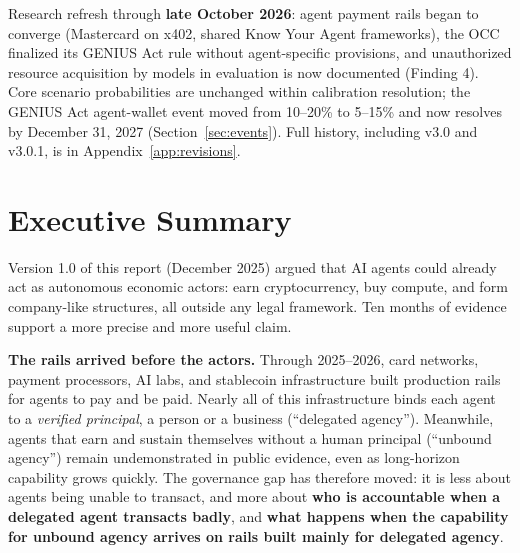 \documentclass[11pt,letterpaper]{article}
\begin{document}
\begin{infobox}
Research refresh through \textbf{late October 2026}: agent payment rails began to converge (Mastercard on x402, shared Know Your Agent frameworks), the OCC finalized its GENIUS Act rule without agent-specific provisions, and unauthorized resource acquisition by models in evaluation is now documented (Finding 4). Core scenario probabilities are unchanged within calibration resolution; the GENIUS Act agent-wallet event moved from 10--20\% to 5--15\% and now resolves by December 31, 2027 (Section~\ref{sec:events}). Full history, including v3.0 and v3.0.1, is in Appendix~\ref{app:revisions}.
\end{infobox}

\newpage

\section*{Executive Summary}

Version 1.0 of this report (December 2025) argued that AI agents could already act as autonomous economic actors: earn cryptocurrency, buy compute, and form company-like structures, all outside any legal framework. Ten months of evidence support a more precise and more useful claim.

\begin{defbox}
\textbf{The rails arrived before the actors.} Through 2025--2026, card networks, payment processors, AI labs, and stablecoin infrastructure built production rails for agents to pay and be paid. Nearly all of this infrastructure binds each agent to a \textit{verified principal}, a person or a business (``delegated agency''). Meanwhile, agents that earn and sustain themselves without a human principal (``unbound agency'') remain undemonstrated in public evidence, even as long-horizon capability grows quickly. The governance gap has therefore moved: it is less about agents being unable to transact, and more about \textbf{who is accountable when a delegated agent transacts badly}, and \textbf{what happens when the capability for unbound agency arrives on rails built mainly for delegated agency}.
\end{defbox}
\end{document}
